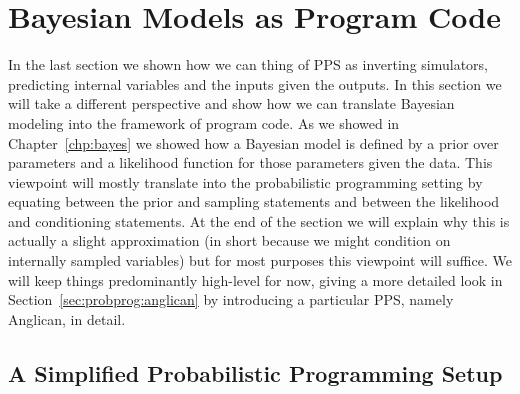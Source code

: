 
\section{Bayesian Models as Program Code}
\label{sec:probprog:models}

In the last section we shown how we can thing of PPS as inverting simulators, predicting internal
variables and the inputs given the outputs.  In this section we will take a different perspective and
show how we can translate Bayesian modeling into the framework of program code.  As we 
showed in Chapter~\ref{chp:bayes} we showed how a Bayesian model is defined by a prior over
parameters and a likelihood function for those parameters given the data.  This viewpoint will
mostly translate into the probabilistic programming setting by equating between the prior
and sampling statements and between the likelihood and conditioning statements.  At the end
of the section we will explain why this is actually a slight approximation (in short because we
might condition on internally sampled variables) but for most purposes this viewpoint will suffice.
We will keep things predominantly high-level for now, giving a more detailed look in
Section~\ref{sec:probprog:anglican} by introducing a particular PPS, namely Anglican, in detail.

\subsection{A Simplified Probabilistic Programming Setup}
\label{sec:probprog:models:first}

